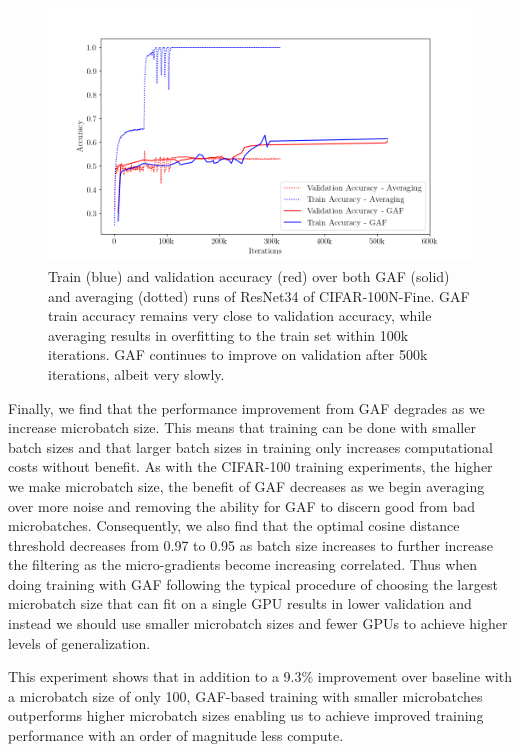\begin{figure}[h]
    \centering
    \includegraphics[width=0.975\linewidth]{figures/figure_6_CIFARN_doesnotoverfit_12.png}
    \caption{Train (blue) and validation accuracy (red) over both GAF (solid) and averaging (dotted) runs of ResNet34 of CIFAR-100N-Fine. GAF train accuracy remains very close to validation accuracy, while averaging results in overfitting to the train set within 100k iterations. GAF continues to improve on validation after 500k iterations, albeit very slowly.}
    \label{fig:cifarn_does_not_overfit_plot}
\end{figure}


Finally, we find that the performance improvement from GAF degrades as we increase microbatch size. This means that training can be done with smaller batch sizes and that larger batch sizes in training only increases computational costs without benefit. As with the CIFAR-100 training experiments, the higher we make microbatch size, the benefit of GAF decreases as we begin averaging over more noise and removing the ability for GAF to discern good from bad microbatches. Consequently, we also find that the optimal cosine distance threshold decreases from 0.97 to 0.95 as batch size increases to further increase the filtering as the micro-gradients become increasing correlated. Thus when doing training with GAF following the typical procedure of choosing the largest microbatch size that can fit on a single GPU results in lower validation and instead we should use smaller microbatch sizes and fewer GPUs to achieve higher levels of generalization.

This experiment shows that in addition to a 9.3\% improvement over baseline with a microbatch size of only 100, GAF-based training with smaller microbatches outperforms higher microbatch sizes enabling us to achieve improved training performance with an order of magnitude less compute. 

